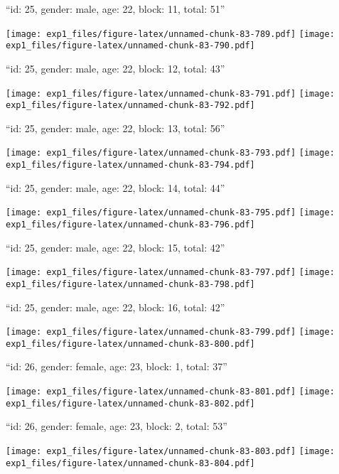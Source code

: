 \documentclass[11pt,,]{article}
\begin{document}
\newpage
[1] 

``id: 25, gender: male, age: 22, block: 11, total: 51''

\texttt{[image: exp1\_files/figure-latex/unnamed-chunk-83-789.pdf]}
\texttt{[image: exp1\_files/figure-latex/unnamed-chunk-83-790.pdf]}

\newpage
[1] 

``id: 25, gender: male, age: 22, block: 12, total: 43''

\texttt{[image: exp1\_files/figure-latex/unnamed-chunk-83-791.pdf]}
\texttt{[image: exp1\_files/figure-latex/unnamed-chunk-83-792.pdf]}

\newpage
[1] 

``id: 25, gender: male, age: 22, block: 13, total: 56''

\texttt{[image: exp1\_files/figure-latex/unnamed-chunk-83-793.pdf]}
\texttt{[image: exp1\_files/figure-latex/unnamed-chunk-83-794.pdf]}

\newpage
[1] 

``id: 25, gender: male, age: 22, block: 14, total: 44''

\texttt{[image: exp1\_files/figure-latex/unnamed-chunk-83-795.pdf]}
\texttt{[image: exp1\_files/figure-latex/unnamed-chunk-83-796.pdf]}

\newpage
[1] 

``id: 25, gender: male, age: 22, block: 15, total: 42''

\texttt{[image: exp1\_files/figure-latex/unnamed-chunk-83-797.pdf]}
\texttt{[image: exp1\_files/figure-latex/unnamed-chunk-83-798.pdf]}

\newpage
[1] 

``id: 25, gender: male, age: 22, block: 16, total: 42''

\texttt{[image: exp1\_files/figure-latex/unnamed-chunk-83-799.pdf]}
\texttt{[image: exp1\_files/figure-latex/unnamed-chunk-83-800.pdf]}

\newpage
[1] 

``id: 26, gender: female, age: 23, block: 1, total: 37''

\texttt{[image: exp1\_files/figure-latex/unnamed-chunk-83-801.pdf]}
\texttt{[image: exp1\_files/figure-latex/unnamed-chunk-83-802.pdf]}

\newpage
[1] 

``id: 26, gender: female, age: 23, block: 2, total: 53''

\texttt{[image: exp1\_files/figure-latex/unnamed-chunk-83-803.pdf]}
\texttt{[image: exp1\_files/figure-latex/unnamed-chunk-83-804.pdf]}
\end{document}
